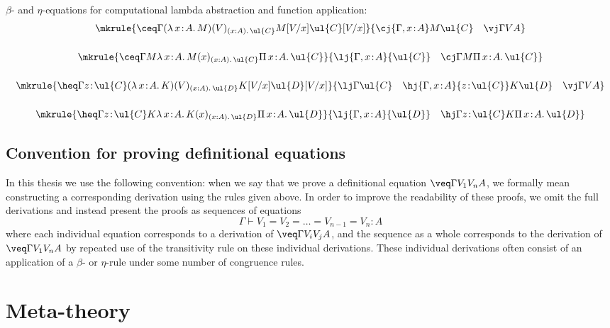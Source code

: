 \vspace{0.25cm}

\noindent
$\beta$- and $\eta$-equations for computational lambda abstraction and function application:
\vspace{0.05cm}
\[
\begin{array}{c}
\mkrule
{\ceq \Gamma {(\lambda \, x \!:\! A .\, M)(V)_{(x : A) .\, \ul{C}}} {M[V/x]} {\ul{C}[V/x]}}
{\cj {\Gamma, x \!:\! A} M \ul{C} \quad \vj \Gamma V A}
\\[6mm]
\mkrule
{\ceq \Gamma {M} {\lambda \, x \!:\! A .\, M(x)_{(x : A) .\, \ul{C}}} {\Pi \, x \!:\! A .\, \ul{C}}}
{\lj {\Gamma, x \!:\! A} {\ul{C}} \quad \cj \Gamma M {\Pi \, x \!:\! A .\, \ul{C}}}
\\[6mm]
\mkrule
{\heq \Gamma {z \!:\! \ul{C}} {(\lambda \, x \!:\! A .\, K)(V)_{(x : A) .\, \ul{D}}} {K[V/x]} {\ul{D}[V/x]}}
{\lj \Gamma {\ul{C}} \quad \hj {\Gamma, x \!:\! A} {z \!:\! \ul{C}} K \ul{D} \quad \vj \Gamma V A}
\\[6mm]
\mkrule
{\heq \Gamma {z \!:\! \ul{C}} {K} {\lambda \, x \!:\! A .\, K(x)_{(x : A) .\, \ul{D}}} {\Pi \, x \!:\! A .\, \ul{D}}}
{\lj {\Gamma, x \!:\! A} {\ul{D}} \quad \hj \Gamma {z \!:\! \ul{C}} K {\Pi \, x \!:\! A .\, \ul{D}}}
\end{array}
\]

\vspace{0.1cm}

\subsection*{Convention for proving definitional equations}

In this thesis we use the following convention: when we say that we prove a definitional equation $\veq \Gamma {V_1} {V_n} A$, we formally mean constructing a corresponding derivation using the rules given above. In order to improve the readability of these proofs, we omit the full derivations and instead present the proofs as sequences of equations
\[
\Gamma \vdash V_1 = V_2 = \ldots = V_{n-1} = V_n : A
\]
where each individual equation corresponds to a derivation of  $\veq \Gamma {V_i} {V_j} A$, and the sequence as a whole corresponds to the derivation of $\veq \Gamma {V_1} {V_n} A$ by repeated use of the transitivity rule on these individual derivations. These individual derivations often consist of an application of a  $\beta$- or $\eta$-rule under some number of congruence rules.



\section{Meta-theory}
\label{sect:metatheory}

